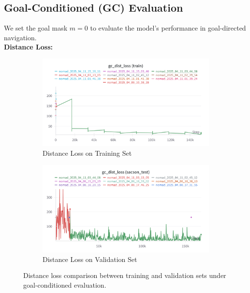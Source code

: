 \documentclass[12pt]{article}
\begin{document}
\subsection*{Goal-Conditioned (GC) Evaluation}
We set the goal mask $m = 0$ to evaluate the model's performance in goal-directed navigation.\\
\noindent \textbf{Distance Loss:}\\
\begin{figure}[H]
    \centering
    \begin{subfigure}[b]{0.48\textwidth}
        \centering
        \includegraphics[width=\textwidth]{images/gc_distloss_nomad.png}
        \caption{Distance Loss on Training Set}
        \label{fig:gc_dist_loss_train}
    \end{subfigure}
    \hfill
    \begin{subfigure}[b]{0.48\textwidth}
        \centering
        \includegraphics[width=\textwidth]{images/gc_dist_loss_test.png}
        \caption{Distance Loss on Validation Set}
        \label{fig:gc_dist_loss_val}
    \end{subfigure}
    \caption{Distance loss comparison between training and validation sets under goal-conditioned evaluation.}
\end{figure}
\end{document}
